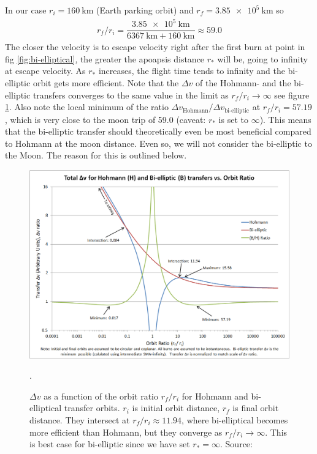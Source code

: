 In our case $r_i = \SI{160}{\km}$ (Earth parking orbit) and $r_f = \SI{3.85e5}{\km}$ so
\begin{align}
r_f/r_i = \dfrac{\SI{3.85e5}{\km}}{\SI{6367}{\km}+\SI{160}{\km}} \approx 59.0
\end{align}
The closer the velocity is to escape velocity right after the first burn at point in fig \ref{fig:bi-elliptical}, the greater the apoapsis distance $r_*$ will be, going to infinity at escape velocity. As $r_*$ increases, the flight time tends to infinity and the bi-elliptic orbit gets more efficient. Note that the $\Delta v$ of the Hohmann- and the bi-elliptic transfers converges to the same value in the limit as $r_f/r_i \to \infty$ see figure \ref{fig:hohmann_vs_bi-elliptic1}. Also note the local minimum of the ratio $\Delta v_{\text{Hohmann}}/\Delta v_{\text{bi-elliptic}}$ at $r_f/r_i = 57.19$, which is very close to the moon trip of 59.0 (caveat: $r_*$ is set to $\infty$). This means that the bi-elliptic transfer should theoretically even be most beneficial compared to Hohmann at the moon distance. Even so, we will not consider the bi-elliptic to the Moon. The reason for this is outlined below.
\begin{figure}[ht]
\centering
\includegraphics[scale=.47]{fig/hohmann_vs_bi-elliptic1.png}
\caption{$\Delta v$ as a function of the orbit ratio $r_f/r_i$ for Hohmann and bi-elliptical transfer orbits. $r_i$ is initial orbit distance, $r_f$ is final orbit distance. They intersect at $r_f/r_i \approx 11.94$, where bi-elliptical becomes more efficient than Hohmann, but they converge as $r_f/r_i \to \infty$. This is best case for bi-elliptic since we have set $r_*=\infty$. Source:\cite{Copperheadtnp}}.
\label{fig:hohmann_vs_bi-elliptic1}
\end{figure}
